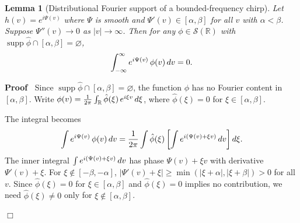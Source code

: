 \documentclass{article}
\newcommand{\nin}{\not\in}
\newcommand{\tmop}[1]{\ensuremath{\operatorname{#1}}}
\newenvironment{proof}{\noindent\textbf{Proof\ }}{\hspace*{\fill}$\Box$\medskip}
\newtheorem{lemma}{Lemma}
\newcommand{\supp}{\tmop{supp}}
\begin{document}
\begin{lemma}
  [Distributional Fourier support of a bounded-frequency
  chirp]\label{lem:chirp-support} Let $h (v) = e^{i \Psi (v)}$ where $\Psi$ is
  smooth and $\Psi' (v) \in [\alpha, \beta]$ for all $v$ with $\alpha <
  \beta$. Suppose $\Psi'' (v) \to 0$ as $|v| \to \infty$. Then for any $\phi
  \in \mathcal{S} (\mathbb{R})$ with $\supp \hat{\phi} \cap [\alpha, \beta] =
  \varnothing$,
  \begin{equation}
    \label{eq:chirp-vanish} \int_{- \infty}^{\infty} e^{i \Psi (v)} 
    \hspace{0.17em} \phi (v)  \hspace{0.17em} dv = 0.
  \end{equation}
\end{lemma}

\begin{proof}
  Since $\supp \hat{\phi} \cap [\alpha, \beta] = \varnothing$, the function
  $\phi$ has no Fourier content in $[\alpha, \beta]$. Write $\phi (v) =
  \frac{1}{2 \pi}  \int_{\mathbb{R}} \hat{\phi} (\xi)  \hspace{0.17em} e^{i
  \xi v}  \hspace{0.17em} d \xi$, where $\hat{\phi} (\xi) = 0$ for $\xi \in
  [\alpha, \beta]$.
  
  The integral becomes
  \[ \int e^{i \Psi (v)}  \hspace{0.17em} \phi (v)  \hspace{0.17em} dv =
     \frac{1}{2 \pi}  \int \hat{\phi} (\xi) \left[ \int e^{i (\Psi (v) + \xi
     v)}  \hspace{0.17em} dv \right] d \xi . \]
  The inner integral $\int e^{i (\Psi (v) + \xi v)}  \hspace{0.17em} dv$ has
  phase $\Psi (v) + \xi v$ with derivative $\Psi' (v) + \xi$. For $\xi \nin [-
  \beta, - \alpha]$, $| \Psi' (v) + \xi | \ge \min (| \xi + \alpha |, | \xi +
  \beta |) > 0$ for all $v$. Since $\hat{\phi} (\xi) = 0$ for $\xi \in
  [\alpha, \beta]$ and $\hat{\phi} (\xi) = 0$ implies no contribution, we need
  $\hat{\phi} (\xi) \ne 0$ only for $\xi \nin [\alpha, \beta]$.
  

\end{proof}
\end{document}
